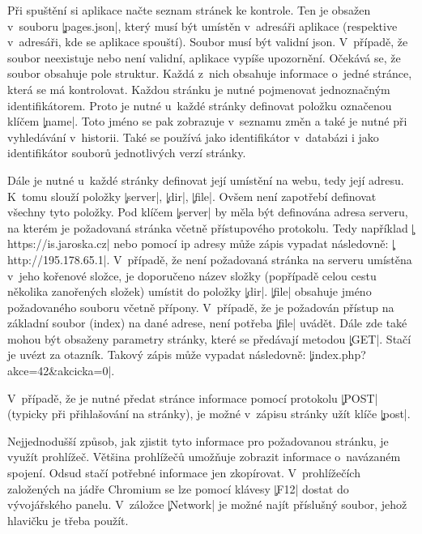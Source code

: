 
Při spuštění si aplikace načte seznam stránek ke kontrole.
Ten je obsažen v~souboru \c|pages.json|, který musí být umístěn v~adresáři aplikace (respektive v~adresáři, kde se aplikace spouští).
Soubor musí být validní json.
V~případě, že soubor neexistuje nebo není validní, aplikace vypíše upozornění. %
Očekává se, že soubor obsahuje pole struktur.
Každá z~nich obsahuje informace o~jedné stránce, která se má kontrolovat.
Každou stránku je nutné pojmenovat jednoznačným identifikátorem.
Proto je nutné u~každé stránky definovat položku označenou klíčem \c|name|.
Toto jméno se pak zobrazuje v~seznamu změn a také je nutné při vyhledávání v~historii.
Také se používá jako identifikátor v~databázi i jako identifikátor souborů jednotlivých verzí stránky.

Dále je nutné u~každé stránky definovat její umístění na webu, tedy její adresu.
K~tomu slouží položky \c|server|, \c|dir|, \c|file|.
Ovšem není zapotřebí definovat všechny tyto položky.
Pod klíčem \c|server| by měla být definována adresa serveru, na kterém je požadovaná stránka včetně přístupového protokolu.
Tedy například \c|https://is.jaroska.cz| nebo pomocí ip adresy může zápis vypadat následovně: \c|http://195.178.65.1|.
V~případě, že není požadovaná stránka na serveru umístěna v~jeho kořenové složce, je doporučeno název složky (popřípadě celou cestu několika zanořených složek) umístit do položky \c|dir|.
\c|file| obsahuje jméno požadovaného souboru včetně přípony.
V~případě, že je požadován přístup na základní soubor (index) na dané adrese, není potřeba \c|file| uvádět.
Dále zde také mohou být obsaženy parametry stránky, které se předávají metodou \c|GET|.
Stačí je uvézt za otazník.
Takový zápis může vypadat následovně: \c|index.php?akce=42&akcicka=0|.

V~případě, že je nutné předat stránce informace pomocí protokolu \c|POST| (typicky při přihlašování na stránky), 
je možné v~zápisu stránky užít klíče \c|post|.

Nejjednodušší způsob, jak zjistit tyto informace pro požadovanou stránku, je využít prohlížeč.
Většina prohlížečů umožňuje zobrazit informace o~navázaném spojení.
Odsud stačí potřebné informace jen zkopírovat.
V~prohlížečích založených na jádře Chromium se lze pomocí klávesy \c|F12| dostat do vývojářského panelu.
V~záložce \c|Network| je možné najít příslušný soubor, jehož hlavičku je třeba použít.

